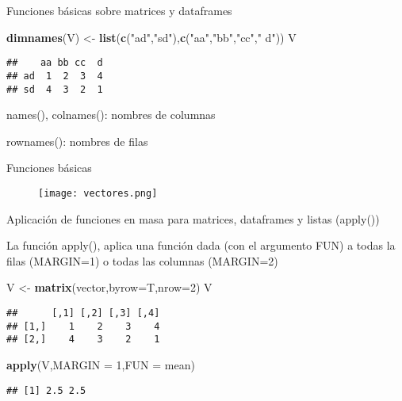\documentclass[ignorenonframetext,]{beamer}
\newenvironment{Shaded}{\begin{snugshade}}{\end{snugshade}}
\newcommand{\KeywordTok}[1]{\textcolor[rgb]{0.13,0.29,0.53}{\textbf{#1}}}
\newcommand{\DataTypeTok}[1]{\textcolor[rgb]{0.13,0.29,0.53}{#1}}
\newcommand{\DecValTok}[1]{\textcolor[rgb]{0.00,0.00,0.81}{#1}}
\newcommand{\StringTok}[1]{\textcolor[rgb]{0.31,0.60,0.02}{#1}}
\newcommand{\NormalTok}[1]{#1}
\begin{document}
\begin{frame}[fragile]{Funciones básicas sobre matrices y dataframes}

\begin{Shaded}
\begin{Highlighting}[]
\KeywordTok{dimnames}\NormalTok{(V) <-}\StringTok{ }\KeywordTok{list}\NormalTok{(}\KeywordTok{c}\NormalTok{(}\StringTok{"ad"}\NormalTok{,}\StringTok{"sd"}\NormalTok{),}\KeywordTok{c}\NormalTok{(}\StringTok{"aa"}\NormalTok{,}\StringTok{"bb"}\NormalTok{,}\StringTok{"cc"}\NormalTok{,}\StringTok{" d"}\NormalTok{))}
\NormalTok{V          }
\end{Highlighting}
\end{Shaded}

\begin{verbatim}
##    aa bb cc  d
## ad  1  2  3  4
## sd  4  3  2  1
\end{verbatim}

names(), colnames(): nombres de columnas

rownames(): nombres de filas

\end{frame}

\begin{frame}{Funciones básicas}

\begin{center}
\begin{figure}
\texttt{[image: vectores.png]}
\end{figure}
\end{center}


\end{frame}

\begin{frame}[fragile]{Aplicación de funciones en masa para matrices,
dataframes y listas (apply())}

La función apply(), aplica una función dada (con el argumento FUN) a
todas la filas (MARGIN=1) o todas las columnas (MARGIN=2)

\begin{Shaded}
\begin{Highlighting}[]
\NormalTok{V <-}\StringTok{ }\KeywordTok{matrix}\NormalTok{(vector,}\DataTypeTok{byrow=}\NormalTok{T,}\DataTypeTok{nrow=}\DecValTok{2}\NormalTok{)}
\NormalTok{V}
\end{Highlighting}
\end{Shaded}

\begin{verbatim}
##      [,1] [,2] [,3] [,4]
## [1,]    1    2    3    4
## [2,]    4    3    2    1
\end{verbatim}

\begin{Shaded}
\begin{Highlighting}[]
\KeywordTok{apply}\NormalTok{(V,}\DataTypeTok{MARGIN =} \DecValTok{1}\NormalTok{,}\DataTypeTok{FUN =}\NormalTok{ mean)}
\end{Highlighting}
\end{Shaded}

\begin{verbatim}
## [1] 2.5 2.5
\end{verbatim}

\end{frame}
\end{document}
